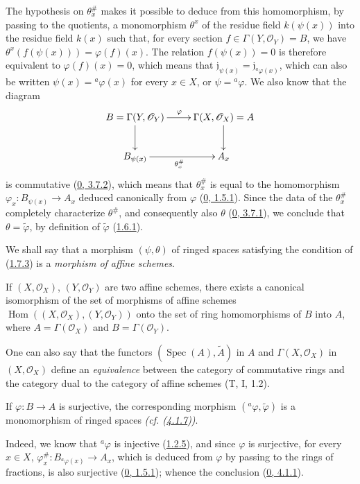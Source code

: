 The hypothesis on $\theta_x^{\#}$ makes it possible to deduce from this
homomorphism, by passing to the quotients, a monomorphism $\theta^x$ of the
residue field $k(\psi(x))$ into the residue field $k(x)$ such that, for every
section $f\in\Gamma(Y,\mathscr{O}_Y)=B$, we have
$\theta^x(f(\psi(x)))=\varphi(f)(x)$. The relation $f(\psi(x))=0$ is
therefore equivalent to $\varphi(f)(x)=0$, which means that
$\mathfrak{j}_{\psi(x)}=\mathfrak{j}_{{}^a\varphi(x)}$, which can also be
written $\psi(x)={}^a\varphi(x)$ for every $x\in X$, or $\psi={}^a\varphi$.
We also know that the diagram
\label{I.1.7.3.diagram}
\[
  \xymatrix{
    B=\Gamma(Y,\mathscr{O}_Y)\ar[r]^\varphi\ar[d] &
    \Gamma(X,\mathscr{O}_X)=A\ar[d]\\
    B_{\psi(x)}\ar[r]_{\theta_x^{\#}} & A_x
  }
\]
is commutative (\hyperref[0.3.7.2]{0, 3.7.2}), which means that
$\theta_x^{\#}$ is equal to the homomorphism
$\varphi_x:B_{\psi(x)}\to A_x$ deduced canonically from $\varphi$
(\hyperref[0.1.5.1]{0, 1.5.1}). Since the data of the $\theta_x^{\#}$
completely characterize $\theta^{\#}$, and consequently also $\theta$
(\hyperref[0.3.7.1]{0, 3.7.1}), we conclude that
$\theta=\widetilde\varphi$, by definition of $\widetilde\varphi$
(\hyperref[I.1.6.1]{1.6.1}).

We shall say that a morphism $(\psi,\theta)$ of ringed spaces satisfying
the condition of (\hyperref[I.1.7.3]{1.7.3}) is a \emph{morphism of
affine schemes}.

\begin{corollary}[1.7.4]
\label{I.1.7.4}
If $(X,\mathscr{O}_X)$, $(Y,\mathscr{O}_Y)$ are two affine schemes, there
exists a canonical isomorphism of the set of morphisms of affine
schemes
$\operatorname{Hom}((X,\mathscr{O}_X),(Y,\mathscr{O}_Y))$ onto the set
of ring homomorphisms of $B$ into $A$, where
$A=\Gamma(\mathscr{O}_X)$ and $B=\Gamma(\mathscr{O}_Y)$.
\end{corollary}

One can also say that the functors $(\operatorname{Spec}(A),\widetilde A)$
in $A$ and $\Gamma(X,\mathscr{O}_X)$ in $(X,\mathscr{O}_X)$ define an
\emph{equivalence} between the category of commutative rings and the
category dual to the category of affine schemes (T, I, 1.2).

\begin{corollary}[1.7.5]
\label{I.1.7.5}
If $\varphi:B\to A$ is surjective, the corresponding morphism
$({}^a\varphi,\widetilde\varphi)$ is a monomorphism of ringed spaces
\emph{(cf. (\hyperref[I.4.1.7]{4.1.7}))}.
\end{corollary}

Indeed, we know that ${}^a\varphi$ is injective
(\hyperref[I.1.2.5]{1.2.5}), and since $\varphi$ is surjective, for every
$x\in X$, $\varphi_x^{\#}:B_{{}^a\varphi(x)}\to A_x$, which is deduced from
$\varphi$ by passing to the rings of fractions, is also surjective
(\hyperref[0.1.5.1]{0, 1.5.1}); whence the conclusion
(\hyperref[0.4.1.1]{0, 4.1.1}).

